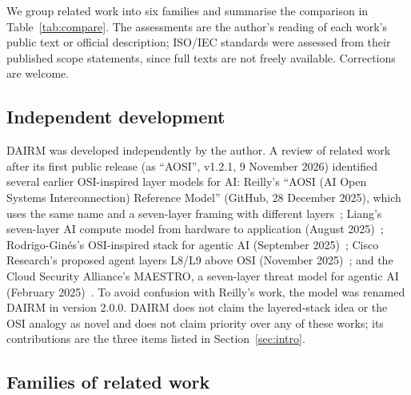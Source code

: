 \documentclass[11pt]{article}
\begin{document}
We group related work into six families and summarise the comparison in Table~\ref{tab:compare}. The assessments are the author's reading of each work's public text or official description; ISO/IEC standards were assessed from their published scope statements, since full texts are not freely available. Corrections are welcome.

\subsection{Independent development}
\label{sec:indep}
DAIRM was developed independently by the author. A review of related work after its first public release (as ``AOSI'', v1.2.1, 9 November 2026) identified several earlier OSI-inspired layer models for AI: Reilly's ``AOSI (AI Open Systems Interconnection) Reference Model'' (GitHub, 28 December 2025), which uses the same name and a seven-layer framing with different layers~\cite{reilly2025aosi}; Liang's seven-layer AI compute model from hardware to application (August 2025)~\cite{liang2025compute}; Rodrigo-Gin\'es's OSI-inspired stack for agentic AI (September 2025)~\cite{rodrigogines2025osi}; Cisco Research's proposed agent layers L8/L9 above OSI (November 2025)~\cite{fleming2025ioa}; and the Cloud Security Alliance's MAESTRO, a seven-layer threat model for agentic AI (February 2025)~\cite{huang2025maestro}. To avoid confusion with Reilly's work, the model was renamed DAIRM in version 2.0.0. DAIRM does not claim the layered-stack idea or the OSI analogy as novel and does not claim priority over any of these works; its contributions are the three items listed in Section~\ref{sec:intro}.

\subsection{Families of related work}
\end{document}
